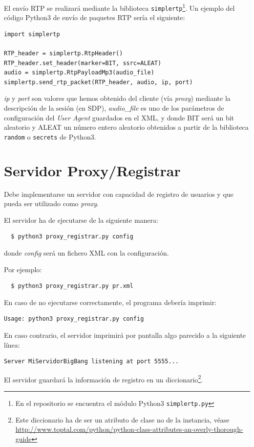 \documentclass[a4paper,11pt]{article}
\begin{document}
El envío RTP se realizará mediante la biblioteca \texttt{simplertp}\footnote{En el repositorio se encuentra el módulo Python3 \texttt{simplertp.py}}. Un ejemplo del código Python3 de envío de paquetes RTP sería el siguiente:

\begin{verbatim}
import simplertp

RTP_header = simplertp.RtpHeader()
RTP_header.set_header(marker=BIT, ssrc=ALEAT)
audio = simplertp.RtpPayloadMp3(audio_file)
simplertp.send_rtp_packet(RTP_header, audio, ip, port)
\end{verbatim}

\emph{ip} y \emph{port} son valores que hemos obtenido del cliente (vía \emph{proxy}) mediante la descripción de la sesión (en SDP), \emph{audio\_file} es uno de los parámetros de configuración del \emph{User Agent} guardados en el XML, y donde BIT será un bit aleatorio y ALEAT un número entero aleatorio obtenidos a partir de la biblioteca \texttt{random} o \texttt{secrets} de Python3.


\section{Servidor Proxy/Registrar}


Debe implementarse un servidor con capacidad de registro de usuarios y que pueda ser utilizado como \emph{proxy}.

El servidor ha de ejecutarse de la siguiente manera:
\begin{verbatim}
  $ python3 proxy_registrar.py config
\end{verbatim}

donde \emph{config} será un fichero XML con la configuración.

Por ejemplo:
\begin{verbatim}
  $ python3 proxy_registrar.py pr.xml
\end{verbatim}

En caso de no ejecutarse correctamente, el programa debería imprimir:
\begin{verbatim}
Usage: python3 proxy_registrar.py config
\end{verbatim}

En caso contrario, el servidor imprimirá por pantalla algo parecido a la siguiente línea:
\begin{verbatim}
Server MiServidorBigBang listening at port 5555...
\end{verbatim}

El servidor guardará la información de registro en un diccionario\footnote{Este diccionario ha de ser un atributo de clase no de la instancia, véase \url{http://www.toptal.com/python/python-class-attributes-an-overly-thorough-guide}}.
\end{document}
